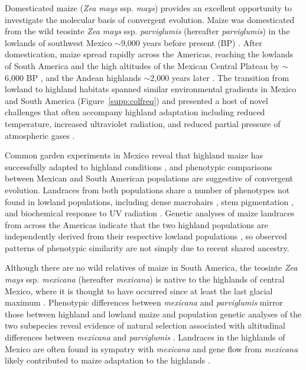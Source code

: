 Domesticated maize (\emph{Zea mays} ssp. \emph{mays}) provides an excellent opportunity to investigate the molecular basis of convergent evolution.  
Maize was domesticated from the wild teosinte \emph{Zea mays} ssp. \emph{parviglumis} (hereafter \emph{parviglumis}) in the lowlands of southwest Mexico $\sim$9,000 years before present (BP) \cite[]{Matsuoka_2002_11983901,Piperno_2009_19307570,vanHeerwaarden_2011_21189301}. 
After domestication, maize spread rapidly across the Americas, reaching the lowlands of South America and the high altitudes of the Mexican Central Plateau by $\sim$6,000 BP \cite[]{Piperno_2006_69}, and the Andean highlands $\sim$2,000 years later \cite[]{Perry_2006_16511492,Grobman_2012_22307642}. 
The transition from lowland to highland habitats spanned similar environmental gradients in Mexico and South America (Figure~\ref{supp:colfreq}) and presented a host of novel challenges that often accompany highland adaptation including reduced temperature, increased ultraviolet radiation, and reduced partial pressure of atmospheric gases \cite[]{Korner_2007_17988759}.

Common garden experiments in Mexico reveal that highland maize has successfully adapted to highland conditions \cite[]{Mercer2008}, and phenotypic comparisons between Mexican and South American populations are suggestive of convergent evolution.  
Landraces from both populations share a number of phenotypes not found in lowland populations, including dense macrohairs \cite[]{Wilkes_1977,Wellhausen1957:book}, stem pigmentation \cite[]{Wilkes_1977,Wellhausen1957:book}, and biochemical response to UV radiation \cite[]{Casati2005}. 
Genetic analyses of maize landraces from across the Americas indicate that the two highland populations are independently derived from their respective lowland populations \cite[]{Vigouroux_2008_21632329, vanHeerwaarden_2011_21189301}, so observed patterns of phenotypic similarity are not simply due to recent shared ancestry. 

Although there are no wild relatives of maize in South America, the teosinte \emph{Zea mays} ssp. \emph{mexicana} (hereafter \emph{mexicana}) is native to the highlands of central Mexico, where it is thought to have occurred since at least the last glacial maximum \cite[]{Ross-Ibarra_2009_19153259, Hufford_niche}. Phenotypic differences between \emph{mexicana} and \emph{parviglumis} mirror those between highland and lowland maize \cite[]{Lauter_2004_15342532} and population genetic analyses of the two subspecies reveal evidence of natural selection associated with altitudinal differences between \emph{mexicana} and \emph{parviglumis} \cite[]{Pyhajarvi2013}.  Landraces in the highlands of Mexico are often found in sympatry with  \emph{mexicana} and gene flow from \emph{mexicana} likely contributed to maize adaptation to the highlands \cite[]{Profford_2013}.

